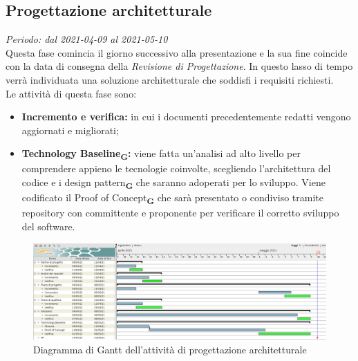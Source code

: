 \subsection{Progettazione architetturale}
\textit{Periodo: dal 2021-04-09 al 2021-05-10}\\
Questa fase comincia il giorno successivo alla presentazione e la sua fine coincide con la data di consegna della \textit{Revisione di Progettazione}. In questo lasso di tempo verrà individuata una soluzione architetturale che soddisfi i requisiti richiesti.\\
Le attività di questa fase sono:
\begin {itemize}
\item \textbf{Incremento e verifica:} in cui i documenti precedentemente redatti vengono aggiornati e migliorati;
\item \textbf{Technology Baseline\textsubscript{\textbf{G}}:} viene fatta un’analisi ad alto livello per comprendere appieno le tecnologie coinvolte, scegliendo l’architettura del codice e i design pattern\textsubscript{\textbf{G}} che saranno adoperati per lo sviluppo. Viene codificato il Proof of Concept\textsubscript{\textbf{G}} che sarà presentato o condiviso tramite repository con committente e proponente per verificare il corretto sviluppo del software.
\end {itemize}
\begin{figure}[!ht]
    \caption{Diagramma di Gantt dell’attività di progettazione architetturale}
    \vspace{5px}
    \includegraphics[scale=0.3]{../../../Images/Diagrammi/Gantt/progettArchitetturale.png}
    \centering
\end{figure}

